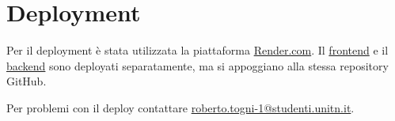 \documentclass[9pt]{extarticle}
\begin{document}
\section{Deployment}

Per il deployment è stata utilizzata la piattaforma \href{https://render.com/}{Render.com}. Il \href{https://is-progetto-1.onrender.com}{frontend} e il \href{https://is-progetto.onrender.com}{backend} sono deployati separatamente, ma si appoggiano alla stessa repository GitHub.

Per problemi con il deploy contattare \href{mailto:roberto.togni-1@studenti.unitn.it}{roberto.togni-1@studenti.unitn.it}.

	
\end{document}

